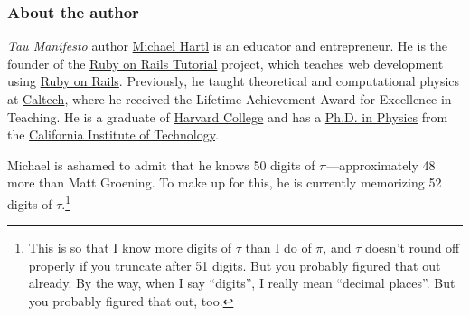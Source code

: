 \documentclass{article}
\begin{document}

    \subsubsection{About the author} %
    \label{sec:about_the_author}
    

\emph{Tau Manifesto} author \href{http://www.michaelhartl.com/}{Michael Hartl} is an educator and entrepreneur. He is the founder of the \href{http://www.railstutorial.org/}{Ruby on Rails Tutorial} project, which teaches web development using \href{http://www.rubyonrails.org/}{Ruby on Rails}. Previously, he taught theoretical and computational physics at  \href{http://www.caltech.edu/}{Caltech}, where he received the Lifetime Achievement Award for Excellence in Teaching. He is a graduate of \href{http://college.harvard.edu/}{Harvard College} and has a \href{http://thesis.library.caltech.edu/1940/}{Ph.D. in Physics} from the \href{http://www.caltech.edu/}{California Institute of Technology}.

Michael is ashamed to admit that he knows 50 digits of $\pi$---approximately 48 more than Matt Groening. To make up for this, he is currently memorizing 52 digits of $\tau$.\footnote{This is so that I know more digits of $\tau$ than I do of $\pi$, and $\tau$ doesn't round off properly if you truncate after 51 digits. But you probably figured that out already. By the way, when I say ``digits'', I really mean ``decimal places''. But you probably figured that out, too.}
\end{document}
